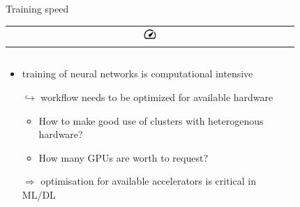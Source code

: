 \documentclass[compress,aspectratio=169]{beamer}
\begin{document}
\begin{frame}{Training speed 
              \begin{tabular}{@{}c@{}}
                  \includegraphics[width=0.05\textwidth]{assets/speed_FILL0_wght400_GRAD0_opsz48.png}
              \end{tabular}
              }

    \vspace{-3em}

    \begin{columns}
        \begin{column}{0.6\textwidth}
            \begin{itemize}
                \item training of neural networks is computational intensive
                \item[$\hookrightarrow$] workflow needs to be optimized for available hardware
                    \begin{itemize}
                        \item How to make good use of clusters with heterogenous hardware?
                        \item How many GPUs are worth to request?
                    \end{itemize}
                    \vspace{2em}
                \item[$\Rightarrow$] optimisation for available accelerators is critical in ML/DL
            \end{itemize}
        \end{column}
        \begin{column}{0.4\textwidth}
            \vspace{-1em}
            \begin{figure}

\end{figure}
\end{column}
\end{columns}
\end{frame}
\end{document}
